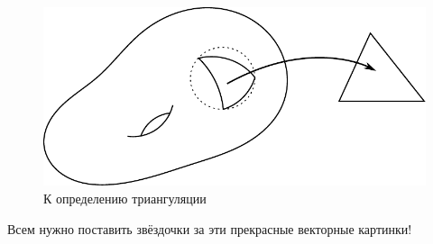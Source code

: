 \begin{figure}[H]
    \centering
    \includegraphics[scale=1]{images/c10.1.pdf}
    \caption{К определению триангуляции}
    \label{fig:c10.1}
\end{figure}
Всем нужно поставить звёздочки за эти прекрасные векторные картинки!